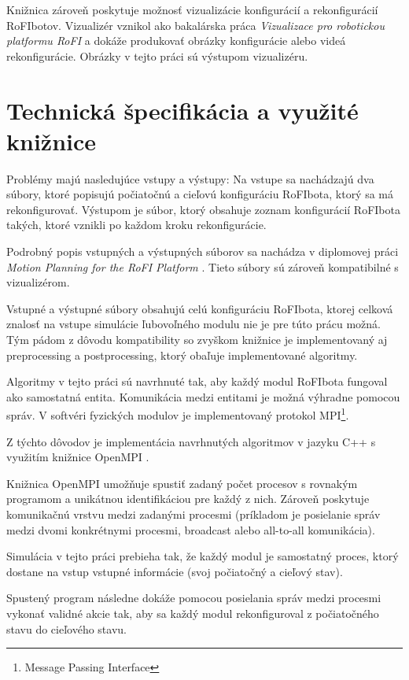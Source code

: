 \documentclass[
  digital, %
  oneside, %
  table,   %
  lof,     %
  nolot,     %
]{fithesis3}
\begin{document}
Knižnica zároveň poskytuje možnosť vizualizácie konfigurácií a rekonfigurácií RoFIbotov. Vizualizér vznikol ako bakalárska práca \textit{Vizualizace pro robotickou platformu RoFI} \cite{nausovaBachelorThesis} a dokáže produkovať obrázky konfigurácie alebo videá rekonfigurácie. Obrázky v tejto práci sú výstupom vizualizéru. 

\section{Technická špecifikácia a využité knižnice}
\label{sec:libraries}
Problémy majú nasledujúce vstupy a výstupy: Na vstupe sa nachádzajú dva súbory, ktoré popisujú počiatočnú a cieľovú konfiguráciu RoFIbota, ktorý sa má rekonfigurovať. Výstupom je súbor, ktorý obsahuje zoznam konfigurácií RoFIbota takých, ktoré vznikli po každom kroku rekonfigurácie. 

Podrobný popis vstupných a výstupných súborov sa nachádza v diplomovej práci \textit{Motion Planning for the RoFI Platform} \cite{vozarovaMasterThesis}. Tieto súbory sú zároveň kompatibilné s vizualizérom. 

Vstupné a výstupné súbory obsahujú celú konfiguráciu RoFIbota, ktorej celková znalosť na vstupe simulácie ľubovoľného modulu nie je pre túto prácu možná. Tým pádom z dôvodu kompatibility so zvyškom knižnice je implementovaný aj preprocessing a postprocessing, ktorý obaľuje implementované algoritmy. 

Algoritmy v tejto práci sú navrhnuté tak, aby každý modul RoFIbota fungoval ako samostatná entita. Komunikácia medzi entitami je možná výhradne pomocou správ. V softvéri fyzických modulov je implementovaný protokol MPI\footnote{Message Passing Interface}. 

Z týchto dôvodov je implementácia navrhnutých algoritmov v jazyku C++ s využitím knižnice OpenMPI \cite{openMPILibrary}. 

Knižnica OpenMPI umožňuje spustiť zadaný počet procesov s rovnakým programom a unikátnou identifikáciou pre každý z nich. Zároveň poskytuje komunikačnú vrstvu medzi zadanými procesmi (príkladom je posielanie správ medzi dvomi konkrétnymi procesmi, broadcast alebo all-to-all komunikácia). 

Simulácia v tejto práci prebieha tak, že každý modul je samostatný proces, ktorý dostane na vstup vstupné informácie (svoj počiatočný a cieľový stav). 

Spustený program následne dokáže pomocou posielania správ medzi procesmi vykonať validné akcie tak, aby sa každý modul rekonfiguroval z počiatočného stavu do cieľového stavu. 
\end{document}
